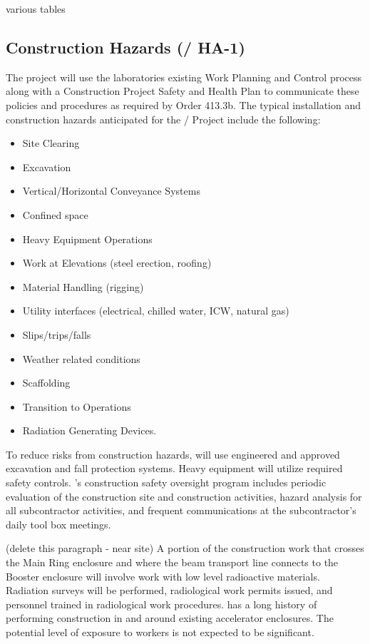 various tables

\subsection{Construction Hazards (/ HA-1)}

The project will use the laboratories existing Work Planning and
Control process along with a Construction Project Safety and Health
Plan to communicate these policies and procedures as required by 
Order 413.3b. The typical installation and construction hazards
anticipated for the / Project include the following:
\begin{itemize}
 \item Site Clearing
 \item Excavation
 \item Vertical/Horizontal Conveyance Systems
 \item Confined space
 \item Heavy Equipment Operations
 \item Work at Elevations (steel erection, roofing)
 \item Material Handling (rigging)
 \item Utility interfaces (electrical, chilled water, ICW, natural gas)
 \item Slips/trips/falls
 \item Weather related conditions
 \item Scaffolding
 \item Transition to Operations
 \item Radiation Generating Devices.
\end{itemize}

To reduce risks from construction hazards, \fnal will use
engineered and approved excavation and fall protection systems.  Heavy
equipment will utilize required safety controls. \fnal's
construction safety oversight program includes periodic evaluation of
the construction site and construction activities, hazard analysis for
all subcontractor activities, and frequent  communications at the
subcontractor's daily tool box meetings.

(delete this paragraph - near site) A portion of the construction work that crosses the Main Ring
enclosure and where the beam transport line connects to the Booster
enclosure will involve work with low level radioactive
materials. Radiation surveys will be performed, radiological work
permits issued, and personnel trained in radiological work
procedures. \fnal has a long history of performing construction in
and around existing accelerator enclosures. The potential level of
exposure to workers is not expected to be significant.

